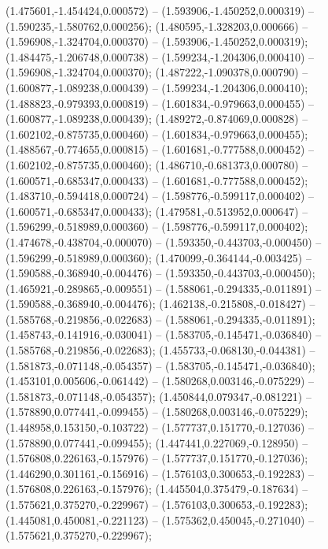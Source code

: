  (1.475601,-1.454424,0.000572) -- (1.593906,-1.450252,0.000319) -- (1.590235,-1.580762,0.000256);
 (1.480595,-1.328203,0.000666) -- (1.596908,-1.324704,0.000370) -- (1.593906,-1.450252,0.000319);
 (1.484475,-1.206748,0.000738) -- (1.599234,-1.204306,0.000410) -- (1.596908,-1.324704,0.000370);
 (1.487222,-1.090378,0.000790) -- (1.600877,-1.089238,0.000439) -- (1.599234,-1.204306,0.000410);
 (1.488823,-0.979393,0.000819) -- (1.601834,-0.979663,0.000455) -- (1.600877,-1.089238,0.000439);
 (1.489272,-0.874069,0.000828) -- (1.602102,-0.875735,0.000460) -- (1.601834,-0.979663,0.000455);
 (1.488567,-0.774655,0.000815) -- (1.601681,-0.777588,0.000452) -- (1.602102,-0.875735,0.000460);
 (1.486710,-0.681373,0.000780) -- (1.600571,-0.685347,0.000433) -- (1.601681,-0.777588,0.000452);
 (1.483710,-0.594418,0.000724) -- (1.598776,-0.599117,0.000402) -- (1.600571,-0.685347,0.000433);
 (1.479581,-0.513952,0.000647) -- (1.596299,-0.518989,0.000360) -- (1.598776,-0.599117,0.000402);
 (1.474678,-0.438704,-0.000070) -- (1.593350,-0.443703,-0.000450) -- (1.596299,-0.518989,0.000360);
 (1.470099,-0.364144,-0.003425) -- (1.590588,-0.368940,-0.004476) -- (1.593350,-0.443703,-0.000450);
 (1.465921,-0.289865,-0.009551) -- (1.588061,-0.294335,-0.011891) -- (1.590588,-0.368940,-0.004476);
 (1.462138,-0.215808,-0.018427) -- (1.585768,-0.219856,-0.022683) -- (1.588061,-0.294335,-0.011891);
 (1.458743,-0.141916,-0.030041) -- (1.583705,-0.145471,-0.036840) -- (1.585768,-0.219856,-0.022683);
 (1.455733,-0.068130,-0.044381) -- (1.581873,-0.071148,-0.054357) -- (1.583705,-0.145471,-0.036840);
 (1.453101,0.005606,-0.061442) -- (1.580268,0.003146,-0.075229) -- (1.581873,-0.071148,-0.054357);
 (1.450844,0.079347,-0.081221) -- (1.578890,0.077441,-0.099455) -- (1.580268,0.003146,-0.075229);
 (1.448958,0.153150,-0.103722) -- (1.577737,0.151770,-0.127036) -- (1.578890,0.077441,-0.099455);
 (1.447441,0.227069,-0.128950) -- (1.576808,0.226163,-0.157976) -- (1.577737,0.151770,-0.127036);
 (1.446290,0.301161,-0.156916) -- (1.576103,0.300653,-0.192283) -- (1.576808,0.226163,-0.157976);
 (1.445504,0.375479,-0.187634) -- (1.575621,0.375270,-0.229967) -- (1.576103,0.300653,-0.192283);
 (1.445081,0.450081,-0.221123) -- (1.575362,0.450045,-0.271040) -- (1.575621,0.375270,-0.229967);

